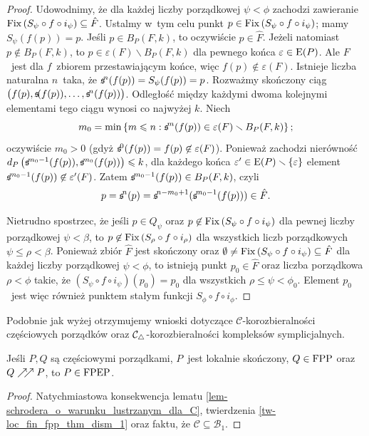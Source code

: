 \begin{proof}
Udowodnimy, że dla każdej liczby porządkowej $\psi<\phi$ zachodzi zawieranie $\operatorname{Fix}\left(S_\psi\circ f\circ i_\psi\right)\subseteq \hat{F}$. Ustalmy w~tym celu punkt $p\in\operatorname{Fix}\left(S_\psi\circ f\circ i_\psi\right)$; mamy $S_{\psi}(f(p))=p$. Jeśli $p\in B_P(F,k)$, to oczywiście $p\in \hat{F}$. Jeżeli natomiast $p\not\in B_P(F,k)$, to $p\in\varepsilon(F)\smallsetminus B_P(F,k)$ dla pewnego końca $\varepsilon\in\mathrm{E}(P)$. Ale $F$~jest dla $f$~zbiorem przestawiającym końce, więc $f(p)\not\in\varepsilon(F)$. Istnieje liczba naturalna $n$~taka, że $\mathfrak{s}\!^n(f(p))=S_{\psi}(f(p))=p$. Rozważmy skończony ciąg $\bigl(f(p),\mathfrak{s}\!(f(p)),\ldots,\mathfrak{s}\!^n(f(p))\bigr)$. Odległość między każdymi dwoma kolejnymi elementami tego ciągu wynosi co najwyżej $k$.  Niech \[m_0=\min\left\{m\leqslant n:\mathfrak{s}\!^m(f(p))\in\varepsilon(F)\smallsetminus B_P(F,k)\right\};\] oczywiście $m_0>0$ (gdyż $\mathfrak{s}\!^0(f(p))=f(p)\not\in\varepsilon(F)$). Ponieważ zachodzi nierówność $d_P\left(\mathfrak{s}\!^{m_0-1}(f(p)),\mathfrak{s}\!^{m_0}(f(p))\right)\leqslant k$, dla każdego końca $\varepsilon'\in\mathrm{E}(P)\smallsetminus\{\varepsilon\}$ element $\mathfrak{s}\!^{m_0-1}(f(p))\not\in\varepsilon'(F)$. Zatem $\mathfrak{s}\!^{m_0-1}(f(p))\in B_P(F,k)$, czyli \[p=\mathfrak{s}\!^{n}(p)=\mathfrak{s}\!^{n-m_0+1}(\mathfrak{s}\!^{m_0-1}(f(p)))\in \hat{F}.\] 

Nietrudno spostrzec, że jeśli $p\in Q_\psi$ oraz $p\not\in \operatorname{Fix}\left(S_\psi\circ f\circ i_\psi\right)$ dla pewnej liczby porządkowej $\psi<\beta$, to $p\not\in \operatorname{Fix}\left(S_\rho\circ f\circ i_\rho\right)$ dla wszystkich liczb porządkowych $\psi\leq \rho<\beta$. Ponieważ zbiór $\hat{F}$ jest skończony oraz $\emptyset\not=\operatorname{Fix}\left(S_\psi\circ f\circ i_\psi\right)\subseteq \hat{F}$ dla każdej liczby porządkowej $\psi<\phi$, to istnieją punkt $p_0\in\hat{F}$ oraz liczba porządkowa $\rho<\phi$ takie, że $\left(S_\psi\circ f\circ i_\psi\right)(p_0)=p_0$ dla wszystkich $\rho\leq \psi<\phi_0$. Element $p_0$~jest więc również punktem stałym funkcji $S_{\phi}\circ f\circ i_{\phi}$.
\end{proof}

Podobnie jak wyżej otrzymujemy wnioski dotyczące $\mathcal{C}$-korozbieralności częściowych porządków oraz $\mathcal{C}_\triangle$-korozbieralności kompleksów symplicjalnych.

\begin{wn}\label{wn-loc_fin_fpp_thm_dism_1}
Jeśli $P,Q$ są częściowymi porządkami, $P$~jest lokalnie skończony, ${Q\in\mathrm{FPP}}$ oraz ${Q\nearrow\!\!\nearrow P}$, to $P\in\mathrm{FPEP}$.
\end{wn}
\begin{proof}
Natychmiastowa konsekwencja lematu \ref{lem-schrodera_o_warunku_lustrzanym_dla_C}, twierdzenia \ref{tw-loc_fin_fpp_thm_dism_1} oraz faktu, że $\mathcal{C}\subseteq\mathcal{B}_1$.
\end{proof}

